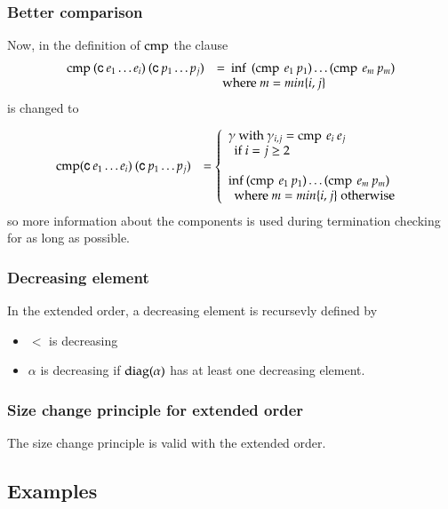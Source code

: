 \subsubsection{Better comparison}
\noindent Now, in the definition of $\operatorname{cmp}$ the clause  
\[
\begin{array}[t]{ll}
\operatorname{cmp} \: (\mathsf{c} \: e_1 \ldots e_i) \: (\mathsf{c} \: p_1 \ldots p_j ) & = \: \operatorname{inf}\: \: (\operatorname{cmp} \: e_1 \: p_1) \ldots (\operatorname{cmp} \: e_m \: p_m)\\
& \: \mbox { where } m = min\{i,j\}\\ 
\end{array}
\]
is changed to

\[
\begin{array}[t]{ll}
\operatorname{cmp} (\mathsf{c} \: e_1 \ldots e_i) \: (\mathsf{c} \: p_1 \ldots p_j ) & = 
\left\{\begin{array}{l} \gamma \mbox{ with } \gamma_{i,j} = \operatorname{cmp} \: e_i \: e_j \\
\: \mbox{ if } i = j \geq 2 \\
\\
\operatorname{inf}\: (\operatorname{cmp} \: e_1 \: p_1) \ldots (\operatorname{cmp} \: e_m \: p_m)\\
\: \mbox { where } m = min\{i,j\} \mbox{ otherwise } 
\end{array}
\right.
\end{array}
\]
so more information about the components is used during termination checking for as long as possible.

\subsubsection{Decreasing element}
In the extended order, a decreasing element is recursevly defined by
\begin{itemize}
\item
$<$ is decreasing
\item
$\alpha$ is decreasing if $\operatorname{diag}(\alpha)$ has at least one decreasing element.
\end{itemize}

\subsubsection{Size change principle for extended order}
The size change principle is valid with the extended order.

\subsection{Examples}

